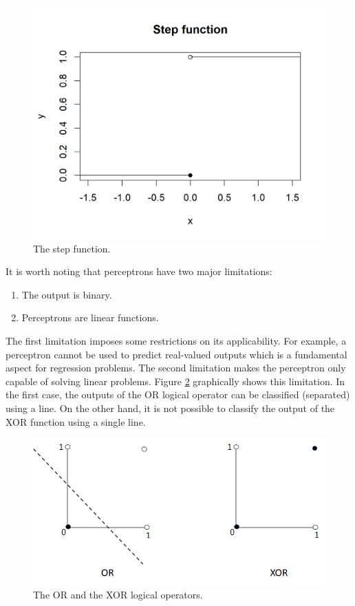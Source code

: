 \documentclass[
  11pt,
]{krantz}
\providecommand{\tightlist}{%
  \setlength{\itemsep}{0pt}\setlength{\parskip}{0pt}}
\begin{document}
\begin{figure}

{\centering \includegraphics[width=1\linewidth]{images/nn_step} 

}

\caption{The step function.}\label{fig:nnStep}
\end{figure}

It is worth noting that perceptrons have two major limitations:

\begin{enumerate}
\def\labelenumi{\arabic{enumi}.}
\tightlist
\item
  The output is binary.
\item
  Perceptrons are linear functions.
\end{enumerate}

The first limitation imposes some restrictions on its applicability. For example, a perceptron cannot be used to predict real-valued outputs which is a fundamental aspect for regression problems. The second limitation makes the perceptron only capable of solving linear problems. Figure \ref{fig:nnLinearity} graphically shows this limitation. In the first case, the outputs of the OR logical operator can be classified (separated) using a line. On the other hand, it is not possible to classify the output of the XOR function using a single line.

\begin{figure}

{\centering \includegraphics[width=0.8\linewidth]{images/nn_linearity} 

}

\caption{The OR and the XOR logical operators.}\label{fig:nnLinearity}
\end{figure}
\end{document}
